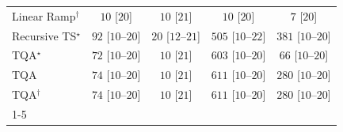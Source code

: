 \begin{tabular}{l|cccc|}
Linear Ramp$^\dagger$ & {\cellcolor[HTML]{F7FCF5}} \color[HTML]{000000} $10$ [$20$] & {\cellcolor[HTML]{F7FCF5}} \color[HTML]{000000} $10$ [$21$] & {\cellcolor[HTML]{F7FCF5}} \color[HTML]{000000} $10$ [$20$] & {\cellcolor[HTML]{F7FCF5}} \color[HTML]{000000} $7$ [$20$] \\
Recursive TS$^\star$ & {\cellcolor[HTML]{E8F6E4}} \color[HTML]{000000} $92$ [$10$--$20$] & {\cellcolor[HTML]{F5FBF2}} \color[HTML]{000000} $20$ [$12$--$21$] & {\cellcolor[HTML]{48AE60}} \color[HTML]{F1F1F1} $505$ [$10$--$22$] & {\cellcolor[HTML]{84CC83}} \color[HTML]{000000} $381$ [$10$--$20$] \\
TQA$^\star$ & {\cellcolor[HTML]{ECF8E8}} \color[HTML]{000000} $72$ [$10$--$20$] & {\cellcolor[HTML]{F7FCF5}} \color[HTML]{000000} $10$ [$21$] & {\cellcolor[HTML]{29914A}} \color[HTML]{F1F1F1} $603$ [$10$--$20$] & {\cellcolor[HTML]{EDF8E9}} \color[HTML]{000000} $66$ [$10$--$20$] \\
TQA & {\cellcolor[HTML]{ECF8E8}} \color[HTML]{000000} $74$ [$10$--$20$] & {\cellcolor[HTML]{F7FCF5}} \color[HTML]{000000} $10$ [$21$] & {\cellcolor[HTML]{268E47}} \color[HTML]{F1F1F1} $611$ [$10$--$20$] & {\cellcolor[HTML]{AEDEA7}} \color[HTML]{000000} $280$ [$10$--$20$] \\
TQA$^\dagger$ & {\cellcolor[HTML]{ECF8E8}} \color[HTML]{000000} $74$ [$10$--$20$] & {\cellcolor[HTML]{F7FCF5}} \color[HTML]{000000} $10$ [$21$] & {\cellcolor[HTML]{268E47}} \color[HTML]{F1F1F1} $611$ [$10$--$20$] & {\cellcolor[HTML]{AEDEA7}} \color[HTML]{000000} $280$ [$10$--$20$] \\
\cline{1-5}
\bottomrule
\end{tabular}
